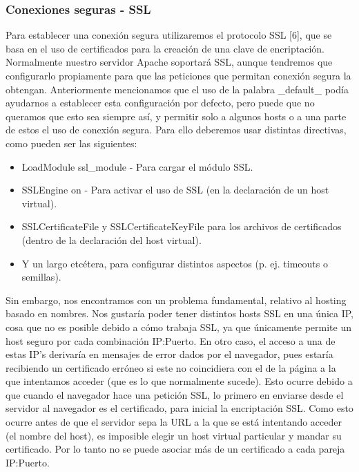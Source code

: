 \documentclass[a4paper, 10pt]{article} %
\begin{document}
\subsubsection{Conexiones seguras - SSL}

Para establecer una conexión segura utilizaremos el protocolo SSL [6], que se basa en el uso de certificados para la creación de una clave de encriptación. Normalmente nuestro servidor Apache soportará SSL, aunque tendremos que configurarlo propiamente para que las peticiones que permitan conexión segura la obtengan. Anteriormente mencionamos que el uso de la palabra \_default\_ podía ayudarnos a establecer esta configuración por defecto, pero puede que no queramos que esto sea siempre así, y permitir solo a algunos hosts o a una parte de estos el uso de conexión segura. Para ello deberemos usar distintas directivas, como pueden ser las siguientes:

\begin{itemize}
\item LoadModule ssl\_module - Para cargar el módulo SSL. 
\item SSLEngine on - Para activar el uso de SSL (en la declaración de un host virtual). 
\item SSLCertificateFile y SSLCertificateKeyFile para los archivos de certificados (dentro de la declaración del host virtual).
\item Y un largo etcétera, para configurar distintos aspectos (p. ej. timeouts o semillas).
\end{itemize}

Sin embargo, nos encontramos con un problema fundamental, relativo al hosting basado en nombres. Nos gustaría poder tener distintos hosts SSL en una única IP, cosa que no es posible debido a cómo trabaja SSL, ya que únicamente permite un host seguro por cada combinación IP:Puerto. En otro caso, el acceso a una de estas IP's derivaría en mensajes de error dados por el navegador, pues estaría recibiendo un certificado erróneo si este no coincidiera con el de la página a la que intentamos acceder (que es lo que normalmente sucede). Esto ocurre debido a que cuando el navegador hace una petición SSL, lo primero en enviarse desde el servidor al navegador es el certificado, para inicial la encriptación SSL. Como esto ocurre antes de que el servidor sepa la URL a la que se está intentando acceder (el nombre del host), es imposible elegir un host virtual particular y mandar su certificado. Por lo tanto no se puede asociar más de un certificado a cada pareja IP:Puerto. 
\end{document}
